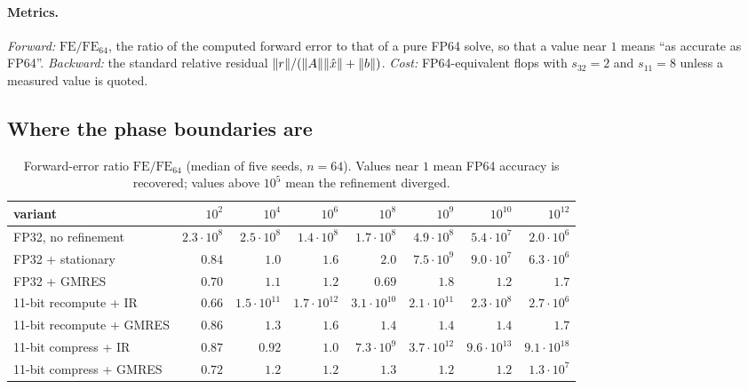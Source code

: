 \paragraph{Metrics.}
\emph{Forward:} $\mathrm{FE}/\mathrm{FE}_{64}$, the ratio of the computed forward
error to that of a pure FP64 solve, so that a value near $1$ means ``as accurate
as FP64''. \emph{Backward:} the standard relative residual
$\lVert r \rVert/(\lVert A \rVert\lVert \hat x \rVert+\lVert b \rVert)$. \emph{Cost:} FP64-equivalent flops
with $s_{32}=2$ and $s_{11}=8$ unless a measured value is quoted.

\subsection{Where the phase boundaries are}

\begin{table}[t]
  \centering
  \small
  \caption{Forward-error ratio $\mathrm{FE}/\mathrm{FE}_{64}$ (median of five
  seeds, $n=64$). Values near $1$ mean FP64 accuracy is recovered; values above
  $10^{5}$ mean the refinement diverged.}
  \label{tab:variants}
  \begin{tabular}{lrrrrrrr}
    \toprule
    variant & $10^{2}$ & $10^{4}$ & $10^{6}$ & $10^{8}$ & $10^{9}$ & $10^{10}$ & $10^{12}$ \\
    \midrule
    FP32, no refinement      & $2.3{\cdot}10^{8}$ & $2.5{\cdot}10^{8}$ & $1.4{\cdot}10^{8}$ & $1.7{\cdot}10^{8}$ & $4.9{\cdot}10^{8}$ & $5.4{\cdot}10^{7}$ & $2.0{\cdot}10^{6}$ \\
    FP32 + stationary        & $0.84$ & $1.0$ & $1.6$ & $2.0$ & $7.5{\cdot}10^{9}$ & $9.0{\cdot}10^{7}$ & $6.3{\cdot}10^{6}$ \\
    FP32 + GMRES             & $0.70$ & $1.1$ & $1.2$ & $0.69$ & $1.8$ & $1.2$ & $1.7$ \\
    11-bit recompute + IR    & $0.66$ & $1.5{\cdot}10^{11}$ & $1.7{\cdot}10^{12}$ & $3.1{\cdot}10^{10}$ & $2.1{\cdot}10^{11}$ & $2.3{\cdot}10^{8}$ & $2.7{\cdot}10^{6}$ \\
    11-bit recompute + GMRES & $0.86$ & $1.3$ & $1.6$ & $1.4$ & $1.4$ & $1.4$ & $1.7$ \\
    11-bit compress + IR     & $0.87$ & $0.92$ & $1.0$ & $7.3{\cdot}10^{9}$ & $3.7{\cdot}10^{12}$ & $9.6{\cdot}10^{13}$ & $9.1{\cdot}10^{18}$ \\
    11-bit compress + GMRES  & $0.72$ & $1.2$ & $1.2$ & $1.3$ & $1.2$ & $1.2$ & $1.3{\cdot}10^{7}$ \\
    \bottomrule
  \end{tabular}
\end{table}

